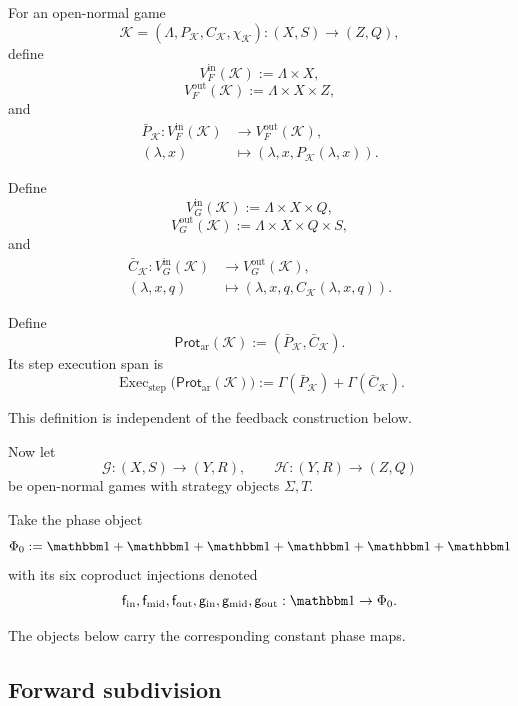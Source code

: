 For an open-normal game
\[
  \mathcal K=(\Lambda,P_{\mathcal K},C_{\mathcal K},\chi_{\mathcal K})
  :
  (X,S)\to(Z,Q),
\]
define
\[
  V_F^{\mathrm{in}}(\mathcal K)
  :=
  \Lambda\times X,
\]
\[
  V_F^{\mathrm{out}}(\mathcal K)
  :=
  \Lambda\times X\times Z,
\]
and
\[
\begin{aligned}
  \bar P_{\mathcal K}:
  V_F^{\mathrm{in}}(\mathcal K)
  &\longrightarrow
  V_F^{\mathrm{out}}(\mathcal K),
  \\
  (\lambda,x)
  &\longmapsto
  (\lambda,x,P_{\mathcal K}(\lambda,x)).
\end{aligned}
\]

Define
\[
  V_G^{\mathrm{in}}(\mathcal K)
  :=
  \Lambda\times X\times Q,
\]
\[
  V_G^{\mathrm{out}}(\mathcal K)
  :=
  \Lambda\times X\times Q\times S,
\]
and
\[
\begin{aligned}
  \bar C_{\mathcal K}:
  V_G^{\mathrm{in}}(\mathcal K)
  &\longrightarrow
  V_G^{\mathrm{out}}(\mathcal K),
  \\
  (\lambda,x,q)
  &\longmapsto
  (\lambda,x,q,C_{\mathcal K}(\lambda,x,q)).
\end{aligned}
\]

\begin{definition}
\label{def:step-execution-open-normal}
Define
\[
  \mathsf{Prot}_{\mathrm{ar}}(\mathcal K)
  :=
  (\bar P_{\mathcal K},\bar C_{\mathcal K}).
\]
Its step execution span is
\[
  \operatorname{Exec}_{\mathrm{step}}
  \bigl(
    \mathsf{Prot}_{\mathrm{ar}}(\mathcal K)
  \bigr)
  :=
  \Gamma(\bar P_{\mathcal K})
  +
  \Gamma(\bar C_{\mathcal K}).
\]
\end{definition}

This definition is independent of the feedback construction below.

Now let
\[
  \mathcal G:(X,S)\to(Y,R),
  \qquad
  \mathcal H:(Y,R)\to(Z,Q)
\]
be open-normal games with strategy objects \(\Sigma,T\).

Take the phase object
\[
  \Phi_0
  :=
  \mathbbm1
  +
  \mathbbm1
  +
  \mathbbm1
  +
  \mathbbm1
  +
  \mathbbm1
  +
  \mathbbm1
\]
with its six coproduct injections denoted
\[
  \mathsf f_{\mathrm{in}},
  \mathsf f_{\mathrm{mid}},
  \mathsf f_{\mathrm{out}},
  \mathsf g_{\mathrm{in}},
  \mathsf g_{\mathrm{mid}},
  \mathsf g_{\mathrm{out}}
  :
  \mathbbm1\to\Phi_0.
\]

The objects below carry the corresponding constant phase maps.

\subsection{Forward subdivision}

